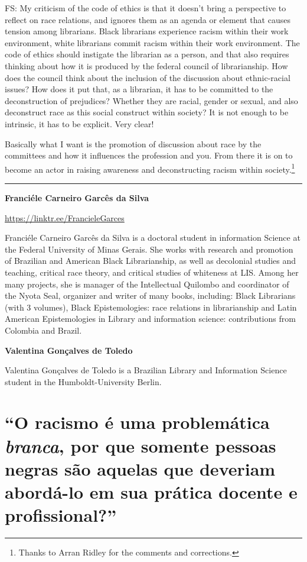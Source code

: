 \documentclass[a4paper,
fontsize=11pt,
oneside,
numbers=noperiodatend,
parskip=half-,
bibliography=totoc,
final
]{scrartcl}
\begin{document}
FS: My criticism of the code of ethics is that it doesn't bring a
perspective to reflect on race relations, and ignores them as an agenda
or element that causes tension among librarians. Black librarians
experience racism within their work environment, white librarians commit
racism within their work environment. The code of ethics should
instigate the librarian as a person, and that also requires thinking
about how it is produced by the federal council of librarianship. How
does the council think about the inclusion of the discussion about
ethnic-racial issues? How does it put that, as a librarian, it has to be
committed to the deconstruction of prejudices? Whether they are racial,
gender or sexual, and also deconstruct race as this social construct
within society? It is not enough to be intrinsic, it has to be explicit.
Very clear!

Basically what I want is the promotion of discussion about race by the
committees and how it influences the profession and you. From there it
is on to become an actor in raising awareness and deconstructing racism
within society.\footnote{Thanks to Arran Ridley for the comments and
  corrections.}

\begin{center}\rule{0.5\linewidth}{0.5pt}\end{center}

\textbf{Franciéle Carneiro Garcês da Silva}

\url{https://linktr.ee/FrancieleGarces}

Franciéle Carneiro Garcês da Silva is a doctoral student in information
Science at the Federal University of Minas Gerais. She works with
research and promotion of Brazilian and American Black Librarianship, as
well as decolonial studies and teaching, critical race theory, and
critical studies of whiteness at LIS. Among her many projects, she is
manager of the Intellectual Quilombo and coordinator of the Nyota Seal,
organizer and writer of many books, including: Black Librarians (with 3
volumes), Black Epistemologies: race relations in librarianship and
Latin American Epistemologies in Library and information science:
contributions from Colombia and Brazil.

\textbf{Valentina Gonçalves de Toledo}

Valentina Gonçalves de Toledo is a Brazilian Library and Information
Science student in the Humboldt-University Berlin.

\newpage

\hypertarget{o-racismo-uxe9-uma-problemuxe1tica-branca-por-que-somente-pessoas-negras-suxe3o-aquelas-que-deveriam-aborduxe1-lo-em-sua-pruxe1tica-docente-e-profissional}{%
\section[\enquote{O racismo é uma problemática \textit{branca}, por que somente
pessoas negras são aquelas que deveriam abordá-lo em sua prática docente
e profissional?}]{\enquote{O racismo é uma problemática \textit{branca}, por que somente
pessoas negras são aquelas que deveriam abordá-lo em sua prática docente
e profissional?}}\label{o-racismo-uxe9-uma-problemuxe1tica-branca-por-que-somente-pessoas-negras-suxe3o-aquelas-que-deveriam-aborduxe1-lo-em-sua-pruxe1tica-docente-e-profissional}}
\end{document}
